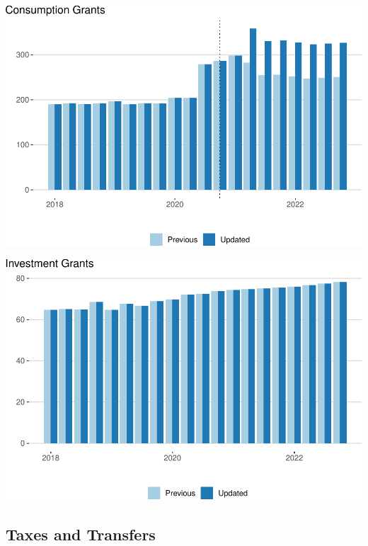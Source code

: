 \documentclass[
]{article}
\begin{document}
\begin{center}\includegraphics{update-changes-levels_files/figure-latex/cgrants-1} \end{center}

\begin{center}\includegraphics{update-changes-levels_files/figure-latex/igrants-1} \end{center}

\hypertarget{taxes-and-transfers}{%
\subsection{Taxes and Transfers}\label{taxes-and-transfers}}
\end{document}
